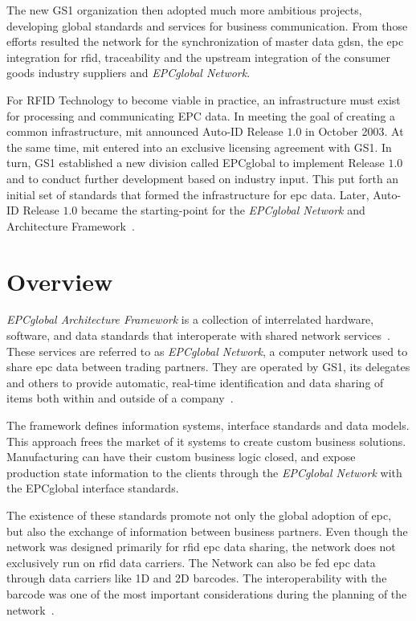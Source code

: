 The new GS1 organization then adopted much more ambitious projects, developing global standards and services for business communication.
From those efforts resulted the network for the synchronization of master data \ac{gdsn}, the \ac{epc} integration for \ac{rfid}, traceability and the upstream integration of the consumer goods industry suppliers and \emph{EPCglobal Network}.

For RFID Technology to become viable in practice, an infrastructure must exist for processing and communicating EPC data. In meeting the goal of creating a common infrastructure, \ac{mit} announced Auto-ID Release $1.0$ in October 2003. At the same time, \ac{mit} entered into an exclusive licensing agreement with GS1.
In turn, GS1 established a new division called EPCglobal to implement Release $1.0$ and to conduct further development based on industry input. This put forth an initial set of standards that formed the infrastructure for \ac{epc} data. Later, Auto-ID Release $1.0$ became the starting-point for the \emph{EPCglobal Network} and Architecture Framework~\cite{GlobalRFIDValue}.

\section{Overview}


\emph{EPCglobal Architecture Framework} is a collection of interrelated hardware, software, and data standards that interoperate with shared network services~\cite{GS1EPCglobalArchitecture}.
These services are referred to as \emph{EPCglobal Network}, a computer network used to share \ac{epc} data between trading partners.
They are operated by GS1, its delegates and others to provide automatic, real-time identification and data sharing of items both within and outside of a company~\cite{lahiriRFIDSourcebook2005}.

The framework defines information systems, interface standards and data models. This approach frees the market of \ac{it} systems to create custom business solutions. Manufacturing can have their custom business logic closed, and expose production state information to the clients through the \emph{EPCglobal Network} with the EPCglobal interface standards.

The existence of these standards promote not only the global adoption of \ac{epc}, but also the exchange of information between business partners.
Even though the network was designed primarily for \ac{rfid} \ac{epc} data sharing, the network does not exclusively run on \ac{rfid} data carriers. The Network can also be fed \ac{epc} data through data carriers like 1D and 2D barcodes. The interoperability with the barcode was one of the most important considerations during the planning of the network~\cite{RFIDBarcodeInteroperability}.

